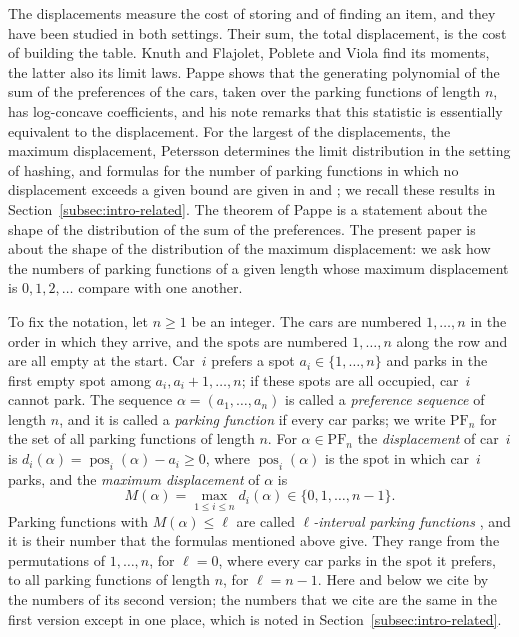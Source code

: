 \documentclass{amsart}
\theoremstyle{definition}
\theoremstyle{remark}
\numberwithin{equation}{section}
\begin{document}
The displacements measure the cost of storing and of finding an item, and they have been studied in both settings. Their sum, the total displacement, is the cost of building the table. Knuth \cite{knuth1998} and Flajolet, Poblete and Viola \cite{flajolet1998} find its moments, the latter also its limit laws. Pappe \cite[Theorem~3.1]{pappe2024} shows that the generating polynomial of the sum of the preferences of the cars, taken over the parking functions of length $n$, has log-concave coefficients, and his note remarks that this statistic is essentially equivalent to the displacement. For the largest of the displacements, the maximum displacement, Petersson \cite[Theorem~2.1]{petersson2009} determines the limit distribution in the setting of hashing, and formulas for the number of parking functions in which no displacement exceeds a given bound are given in \cite{aguilarfraga2024} and \cite{celano2025}; we recall these results in Section~\ref{subsec:intro-related}. The theorem of Pappe is a statement about the shape of the distribution of the sum of the preferences. The present paper is about the shape of the distribution of the maximum displacement: we ask how the numbers of parking functions of a given length whose maximum displacement is $0,1,2,\dots$ compare with one another.

To fix the notation, let $n\ge 1$ be an integer. The cars are numbered $1,\dots,n$ in the order in which they arrive, and the spots are numbered $1,\dots,n$ along the row and are all empty at the start. Car~$i$ prefers a spot $a_i\in\{1,\dots,n\}$ and parks in the first empty spot among $a_i,a_i+1,\dots,n$; if these spots are all occupied, car~$i$ cannot park. The sequence $\alpha=(a_1,\dots,a_n)$ is called a \emph{preference sequence} of length $n$, and it is called a \emph{parking function} if every car parks; we write $\mathrm{PF}_n$ for the set of all parking functions of length $n$. For $\alpha\in\mathrm{PF}_n$ the \emph{displacement} of car~$i$ is $d_i(\alpha)=\operatorname{pos}_i(\alpha)-a_i\ge 0$, where $\operatorname{pos}_i(\alpha)$ is the spot in which car~$i$ parks, and the \emph{maximum displacement} of $\alpha$ is
\[
M(\alpha)=\max_{1\le i\le n}d_i(\alpha)\in\{0,1,\dots,n-1\}.
\]
Parking functions with $M(\alpha)\le\ell$ are called \emph{$\ell$-interval parking functions} \cite[Definition~2.7]{celano2025}, and it is their number that the formulas mentioned above give. They range from the permutations of $1,\dots,n$, for $\ell=0$, where every car parks in the spot it prefers, to all parking functions of length $n$, for $\ell=n-1$. Here and below we cite \cite{celano2025} by the numbers of its second version; the numbers that we cite are the same in the first version except in one place, which is noted in Section~\ref{subsec:intro-related}.
\end{document}
